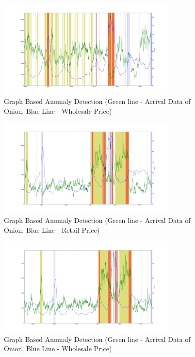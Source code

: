 \documentclass[a4paper,10pt]{report}
\begin{document}
			\begin{figure}[H]
		    	\centering
  		    	\includegraphics[width=0.8\textwidth]{graphs/12341.png}
		    	\caption{Graph Based Anomaly Detection (Green line - Arrival Data of Onion, Blue Line - Wholesale Price)}
		    	\label{fig:12341}
			\end{figure}
			
			
			\begin{figure}[H]
		    	\centering
  		    	\includegraphics[width=0.8\textwidth]{graphs/12322_delhi.png}
		    	\caption{Graph Based Anomaly Detection (Green line - Arrival Data of Onion, Blue Line - Retail Price)}
		    	\label{fig:12322_delhi}
			\end{figure}
			
			\begin{figure}[H]
		    	\centering
  		    	\includegraphics[width=0.8\textwidth]{graphs/12442_delhi.png}
		    	\caption{Graph Based Anomaly Detection (Green line - Arrival Data of Onion, Blue Line - Wholesale Price)}
		    	\label{fig:12442_delhi}
			\end{figure}	
\end{document}
